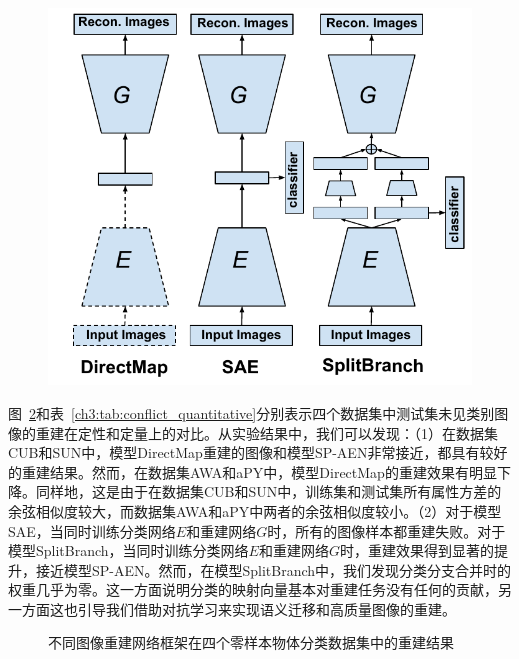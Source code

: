 \begin{figure}
    \centering
        \includegraphics[width=0.95\linewidth]{chapter3/res/conflict.pdf}
    \label{ch3:fig:conflict}
\end{figure}

图~\ref{ch3:fig:conflict_visualization}和表~\ref{ch3:tab:conflict_quantitative}分别表示四个数据集中测试集未见类别图像的重建在定性和定量上的对比。从实验结果中，我们可以发现：（1）在数据集CUB和SUN中，模型DirectMap重建的图像和模型SP-AEN非常接近，都具有较好的重建结果。然而，在数据集AWA和aPY中，模型DirectMap的重建效果有明显下降。同样地，这是由于在数据集CUB和SUN中，训练集和测试集所有属性方差的余弦相似度较大，而数据集AWA和aPY中两者的余弦相似度较小。（2）对于模型SAE，当同时训练分类网络$E$和重建网络$G$时，所有的图像样本都重建失败。对于模型SplitBranch，当同时训练分类网络$E$和重建网络$G$时，重建效果得到显著的提升，接近模型SP-AEN。然而，在模型SplitBranch中，我们发现分类分支合并时的权重几乎为零。这一方面说明分类的映射向量基本对重建任务没有任何的贡献，另一方面这也引导我们借助对抗学习来实现语义迁移和高质量图像的重建。

\begin{figure}[t]
    \centering
    \caption{不同图像重建网络框架在四个零样本物体分类数据集中的重建结果}
    \label{ch3:fig:conflict_visualization}
\end{figure}

